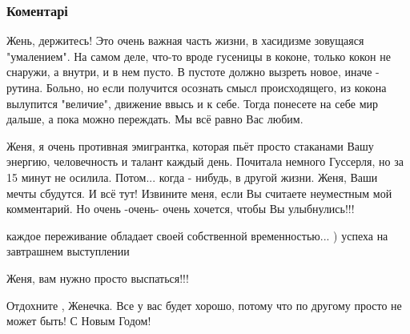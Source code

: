  
 
 
 
 
\subsubsection{Коментарі}

\begin{itemize}


Жень, держитесь! Это очень важная часть жизни, в хасидизме зовущаяся
"умалением". На самом деле, что-то вроде гусеницы в коконе, только кокон не
снаружи, а внутри, и в нем пусто. В пустоте должно вызреть новое, иначе -
рутина. Больно, но если получится осознать смысл происходящего, из кокона
вылупится "величие", движение ввысь и к себе. Тогда понесете на себе мир
дальше, а пока можно переждать. Мы всё равно Вас любим.



Женя, я очень противная эмигрантка, которая пьёт просто стаканами Вашу энергию,
человечность и талант каждый день. Почитала немного Гуссерля, но за 15 минут не
осилила. Потом... когда - нибудь, в другой жизни. Женя, Ваши мечты сбудутся. И
всё тут! Извините меня, если Вы считаете неуместным мой комментарий. Но очень
-очень- очень хочется, чтобы Вы улыбнулись!!!



каждое переживание обладает своей собственной временностью... ) успеха на завтрашнем выступлении



Женя, вам нужно просто выспаться!!!


Отдохните , Женечка. Все у вас будет хорошо, потому что по другому просто не может быть! С Новым Годом!


\end{itemize}
